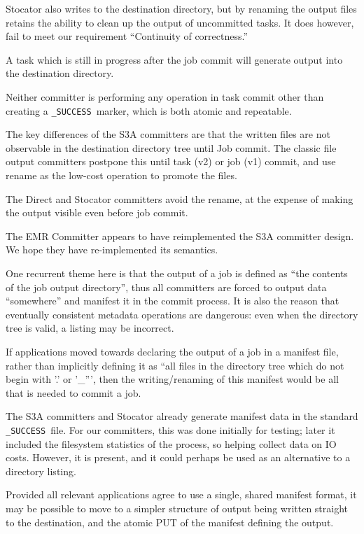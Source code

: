 \documentclass[conference]{IEEEtran}
\newcommand{\SUCCESS}{\texttt{\_SUCCESS}\ }
\begin{document}
Stocator also writes to the destination directory, but by renaming the output
files retains the ability to clean up the output of uncommitted tasks.
It does however, fail to meet our requirement ``Continuity of correctness.''

A task which is still in progress after the job commit will generate output
into the destination directory.

Neither committer is performing any operation in task commit other than creating
a \SUCCESS marker, which is both atomic and repeatable.

The key differences of the S3A committers are that the written files are
not observable in the destination directory tree until Job commit.
The classic file output committers postpone this until task (v2) or job (v1)
commit, and use rename as the low-cost operation to promote the files.


The Direct and Stocator committers avoid the rename, at the expense of making
the output visible even before job commit.

The EMR Committer appears to have reimplemented the S3A committer design.
We hope they have re-implemented its semantics.

One recurrent theme here is that the output of a job is defined as
``the contents of the job output directory'', thus all committers are
forced to output data ``somewhere'' and manifest it in the commit process.
It is also the reason that eventually consistent metadata operations are
dangerous: even when the directory tree is valid, a listing may be incorrect.

If applications moved towards declaring the output of a job in
a manifest file, rather than implicitly defining it as ``all files in the directory
tree which do not begin with '.' or '\_''', then the writing/renaming
of this manifest would be all that is needed to commit a job.

The S3A committers and Stocator already generate manifest data in the
standard \SUCCESS file.
For our committers, this was done initially for testing;
later it included the filesystem statistics of the process, so helping
collect data on IO costs.
However, it is present, and it could perhaps be used as an alternative to
a directory listing.

Provided all relevant applications agree to use a single, shared manifest
format, it may be possible to move to a simpler structure of
output being written straight to the destination, and the atomic PUT of the
manifest defining the output.
\end{document}
